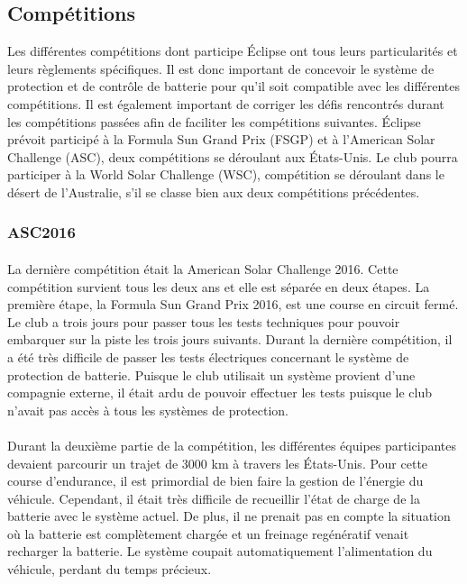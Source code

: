 		\subsection{Compétitions}
		Les différentes compétitions dont participe Éclipse ont tous leurs particularités et leurs règlements spécifiques. Il est donc important de concevoir le système de protection et de contrôle de batterie pour qu'il soit compatible avec les différentes compétitions. Il est également important de corriger les défis rencontrés durant les compétitions passées afin de faciliter les compétitions suivantes. Éclipse prévoit participé à la Formula Sun Grand Prix (FSGP) et à l'American Solar Challenge (ASC), deux compétitions se déroulant aux États-Unis. Le club pourra participer à la World Solar Challenge (WSC), compétition se déroulant dans le désert de l'Australie, s'il se classe bien aux deux compétitions précédentes.

		
	\subsubsection{ASC2016}
		
		\paragraph{}
		La dernière compétition était la American Solar Challenge 2016. Cette compétition survient tous les deux ans et elle est séparée en deux étapes. La première étape, la Formula Sun Grand Prix 2016, est une course en circuit fermé. Le club a trois jours pour passer tous les tests techniques pour pouvoir embarquer sur la piste les trois jours suivants. Durant la dernière compétition, il a été très difficile de passer les tests électriques concernant le système de protection de batterie. Puisque le club utilisait un système provient d'une compagnie externe, il était ardu de pouvoir effectuer les tests puisque le club n'avait pas accès à tous les systèmes de protection.
		
		\paragraph{}
		Durant la deuxième partie de la compétition, les différentes équipes participantes devaient parcourir un trajet de 3000 km à travers les États-Unis. Pour cette course d'endurance, il est primordial de bien faire la gestion de l'énergie du véhicule. Cependant, il était très difficile de recueillir l'état de charge de la batterie avec le système actuel. De plus, il ne prenait pas en compte la situation où la batterie est complètement chargée et un freinage regénératif venait recharger la batterie. Le système coupait automatiquement l'alimentation du véhicule, perdant du temps précieux.


